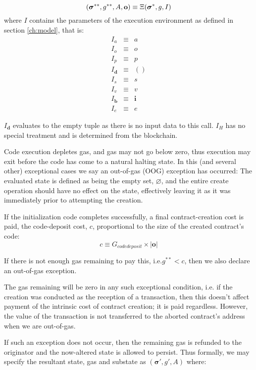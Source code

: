 \documentclass[9pt,oneside]{amsart}
\makeatletter
\newcommand*\ie{i.e.\@\xspace}
\makeatother
\begin{document}
\begin{multicols}{2}
\begin{equation}
(\boldsymbol{\sigma}^{**}, g^{**}, A, \mathbf{o}) \equiv \Xi(\boldsymbol{\sigma}^*, g, I) \\
\end{equation}
where $I$ contains the parameters of the execution environment as defined in section \ref{ch:model}, that is:
\begin{eqnarray}
I_a & \equiv & a \\
I_o & \equiv & o \\
I_p & \equiv & p \\
I_\mathbf{d} & \equiv & () \\
I_s & \equiv & s \\
I_v & \equiv & v \\
I_\mathbf{b} & \equiv & \mathbf{i} \\
I_e & \equiv & e
\end{eqnarray}

$I_\mathbf{d}$ evaluates to the empty tuple as there is no input data to this call. $I_H$ has no special treatment and is determined from the blockchain.

Code execution depletes gas, and gas may not go below zero, thus execution may exit before the code has come to a natural halting state. In this (and several other) exceptional cases we say an out-of-gas (OOG) exception has occurred: The evaluated state is defined as being the empty set, $\varnothing$, and the entire create operation should have no effect on the state, effectively leaving it as it was immediately prior to attempting the creation.

If the initialization code completes successfully, a final contract-creation cost is paid, the code-deposit cost, $c$, proportional to the size of the created contract's code:
\begin{equation}
c \equiv G_{codedeposit} \times |\mathbf{o}|
\end{equation}

If there is not enough gas remaining to pay this, \ie $g^{**} < c$, then we also declare an out-of-gas exception.

The gas remaining will be zero in any such exceptional condition, \ie if the creation was conducted as the reception of a transaction, then this doesn't affect payment of the intrinsic cost of contract creation; it is paid regardless. However, the value of the transaction is not transferred to the aborted contract's address when we are out-of-gas.

If such an exception does not occur, then the remaining gas is refunded to the originator and the now-altered state is allowed to persist. Thus formally, we may specify the resultant state, gas and substate as $(\boldsymbol{\sigma}', g', A)$ where:


\end{multicols}
\end{document}
